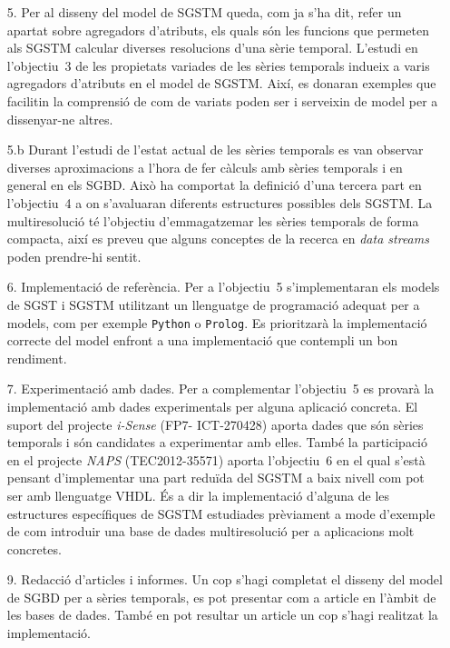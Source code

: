 \begin{itemize}

\item[5.] Per al disseny del model de SGSTM queda, com ja s'ha dit,
  refer un apartat sobre agregadors d'atributs, els quals són les
  funcions que permeten als SGSTM calcular diverses resolucions d'una
  sèrie temporal. L'estudi en l'objectiu~3 de les propietats variades
  de les sèries temporals indueix a varis agregadors d'atributs en el
  model de SGSTM. Així, es donaran exemples que facilitin la
  comprensió de com de variats poden ser i serveixin de model per a
  dissenyar-ne altres.


\item[5.b] Durant l'estudi de l'estat actual de les sèries temporals
  es van observar diverses aproximacions a l'hora de fer càlculs amb
  sèries temporals i en general en els SGBD. Això ha comportat la
  definició d'una tercera part en l'objectiu~4 a on s'avaluaran
  diferents estructures possibles dels SGSTM.  La multiresolució té
  l'objectiu d'emmagatzemar les sèries temporals de forma compacta,
  així es preveu que alguns conceptes de la recerca en \emph{data
    streams} poden prendre-hi sentit.



\item[6.] Implementació de referència. Per a l'objectiu~5 s'implementaran
  els models de SGST i SGSTM utilitzant un llenguatge de programació adequat
  per a models, com per exemple \texttt{Python} o \texttt{Prolog}.  Es
  prioritzarà la implementació correcte del model enfront a una
  implementació que contempli un bon rendiment. 


\item[7.] Experimentació amb dades. Per a complementar l'objectiu~5 es
  provarà la implementació amb dades experimentals per alguna
  aplicació concreta. El suport del projecte \emph{i-Sense} (FP7-
  ICT-270428) aporta dades que són sèries temporals i són candidates a
  experimentar amb elles.  També la participació en el projecte
  \emph{NAPS} (TEC2012-35571) aporta l'objectiu~6 en el qual s'està
  pensant d'implementar una part reduïda del SGSTM a baix nivell com
  pot ser amb llenguatge VHDL. És a dir la implementació d'alguna de
  les estructures específiques de SGSTM estudiades prèviament a mode
  d'exemple de com introduir una base de dades multiresolució per a
  aplicacions molt concretes.




\item[9.] Redacció d'articles i informes. Un cop s'hagi completat el
  disseny del model de SGBD per a sèries temporals, es pot presentar
  com a article en l'àmbit de les bases de dades.  També en pot
  resultar un article un cop s'hagi realitzat la implementació.


\end{itemize}







% 

% 






